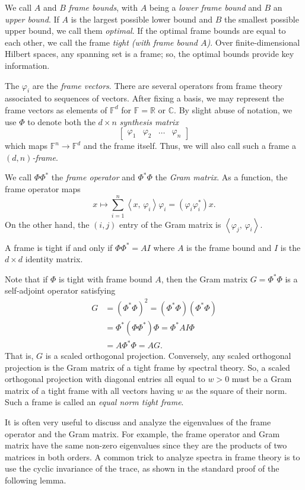 \documentclass[10pt]{article}
\theoremstyle{plain}
\theoremstyle{definition}
\renewcommand{\phi}{\varphi}
\newcommand{\bC}{\mathbb{C}}
\newcommand{\bF}{\mathbb{F}}
\newcommand{\bR}{\mathbb{R}}
\newcommand{\rar}{\rightarrow}
\newcommand{\ip}[2]{\left<#1,\,#2\right>}
\begin{document}
We call $A$ and $B$ \emph{frame bounds}, with $A$ being a \emph{lower frame bound} and $B$ an \emph{upper bound}. If $A$ is the largest possible lower bound and $B$ the smallest possible upper bound, we call them \emph{optimal}. If the optimal frame bounds are equal to each other, we call the frame \emph{tight (with frame bound $A$)}. Over finite-dimensional Hilbert spaces, any spanning set is a frame; so, the optimal bounds provide key information. 

The $\phi_i$ are the \emph{frame vectors}. There are several operators from frame theory associated to sequences of vectors.  After fixing a basis, we may represent the frame vectors as elements of $\bF^d$ for $\bF = \bR$ or $\bC$.  By slight abuse of notation, we use $\Phi$ to denote both the $d \times n$ \emph{synthesis matrix}
\[
\begin{bmatrix}\varphi_1 & \varphi_2 & \hdots & \varphi_n \end{bmatrix}
\]
which maps $\bF^n \rar \bF^d$ and the frame itself.  Thus, we will also call such a frame a \emph{$(d,n)$-frame}.
 
We call $\Phi\Phi^\ast$ the \emph{frame operator} and $\Phi^\ast\Phi$ the \emph{Gram matrix}. As a function, the frame operator maps 
\[
x \mapsto \sum_{i=1}^n \ip{x}{\varphi_i}\varphi_i = (\varphi_i \varphi_i^\ast)x.
\]
On the other hand, the $(i,j)$ entry of the Gram matrix is $\ip{\varphi_j}{\varphi_i}$.

A frame is tight if and only if $\Phi\Phi^\ast = AI$ where $A$ is the frame bound and $I$ is the $d \times d$ identity matrix. 

Note that if $\Phi$ is tight with frame bound $A$, then the Gram matrix $G = \Phi^\ast \Phi$ is a self-adjoint operator satisfying
\begin{align*}
G&= (\Phi^\ast \Phi)^2= (\Phi^\ast \Phi)(\Phi^\ast \Phi) \\
&= \Phi^\ast (\Phi\Phi^\ast) \Phi =\Phi^\ast A I \Phi\\
&= A \Phi^\ast \Phi=AG.
\end{align*}
That is, $G$ is a scaled orthogonal projection. Conversely, any scaled orthogonal projection is the Gram matrix of a tight frame by spectral theory. So, a scaled orthogonal projection with diagonal entries all equal to $w>0$ must be a Gram matrix of a tight frame with all vectors having $w$ as the square of their norm.  Such a frame is called an \emph{equal norm tight frame}.

It is often very useful to discuss and analyze the eigenvalues of the frame operator and the Gram matrix. For example, the frame operator and Gram matrix have the same non-zero eigenvalues since they are the products of two matrices in both orders.  A common trick to analyze spectra in frame theory is to use the cyclic invariance of the trace, as shown in the standard proof of the following lemma.
\end{document}
